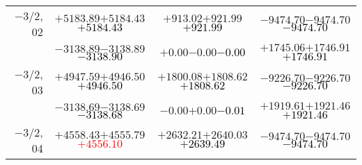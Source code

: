 \documentclass[compress]{beamer}
\begin{document}
\begin{frame}
{\begin{tabular}{r | c | c | c}
$-$3/2, 02 & $+5183.89$\hspace{0.1 cm}$+5184.43$\hspace{0.1 cm}\textcolor{black}{$+5184.43$} & $+913.02$\hspace{0.1 cm}$+921.99$\hspace{0.1 cm}\textcolor{black}{$+921.99$} & $-9474.70$\hspace{0.1 cm}$-9474.70$\hspace{0.1 cm}\textcolor{black}{$-9474.70$} \\
           & $-3138.89$\hspace{0.1 cm}$-3138.89$\hspace{0.1 cm}\textcolor{black}{$-3138.90$} & $+0.00$\hspace{0.1 cm}$-0.00$\hspace{0.1 cm}\textcolor{black}{$-0.00$} & $+1745.06$\hspace{0.1 cm}$+1746.91$\hspace{0.1 cm}\textcolor{black}{$+1746.91$} \\
$-$3/2, 03 & $+4947.59$\hspace{0.1 cm}$+4946.50$\hspace{0.1 cm}\textcolor{black}{$+4946.50$} & $+1800.08$\hspace{0.1 cm}$+1808.62$\hspace{0.1 cm}\textcolor{black}{$+1808.62$} & $-9226.70$\hspace{0.1 cm}$-9226.70$\hspace{0.1 cm}\textcolor{black}{$-9226.70$} \\
           & $-3138.69$\hspace{0.1 cm}$-3138.69$\hspace{0.1 cm}\textcolor{black}{$-3138.68$} & $-0.00$\hspace{0.1 cm}$+0.00$\hspace{0.1 cm}\textcolor{black}{$-0.01$} & $+1919.61$\hspace{0.1 cm}$+1921.46$\hspace{0.1 cm}\textcolor{black}{$+1921.46$} \\
$-$3/2, 04 & $+4558.43$\hspace{0.1 cm}$+4555.79$\hspace{0.1 cm}\textcolor{red}{$+4556.10$} & $+2632.21$\hspace{0.1 cm}$+2640.03$\hspace{0.1 cm}\textcolor{black}{$+2639.49$} & $-9474.70$\hspace{0.1 cm}$-9474.70$\hspace{0.1 cm}\textcolor{black}{$-9474.70$} \\

\end{tabular}}
\end{frame}
\end{document}
